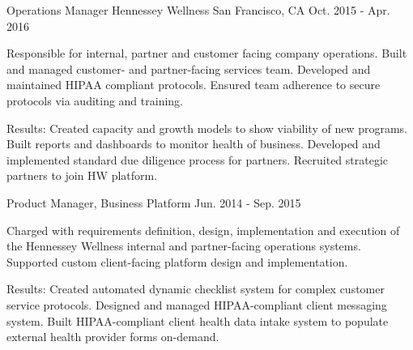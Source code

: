 \begin{cventries}

\cventry
{Operations Manager} %
{Hennessey Wellness} %
{San Francisco, CA} %
{Oct. 2015 - Apr. 2016} %
{ %
\begin{cvitems}
\item {Responsible for internal, partner and customer facing company operations. Built and managed customer- and partner-facing services team. Developed and maintained HIPAA compliant protocols. Ensured team adherence to secure protocols via auditing and training.}
\end{cvitems}
}
\begin{cvitemsnb}
\item {Results: Created capacity and growth models to show viability of new programs. Built reports and dashboards to monitor health of business. Developed and implemented standard due diligence process for partners. Recruited strategic partners to join HW platform.}
\end{cvitemsnb}


\cventry
{Product Manager, Business Platform} %
{} %
{} %
{Jun. 2014 - Sep. 2015} %
{ %
\begin{cvitems}
\item {Charged with requirements definition, design, implementation and execution of the Hennessey Wellness internal and partner-facing operations systems. Supported custom client-facing platform design and implementation.}
\end{cvitems}
}
\begin{cvitemsnb}
\item {Results: Created automated dynamic checklist system for complex customer service protocols. Designed and managed HIPAA-compliant client messaging system. Built HIPAA-compliant client health data intake system to populate external health provider forms on-demand.}
\end{cvitemsnb}




\end{cventries}
